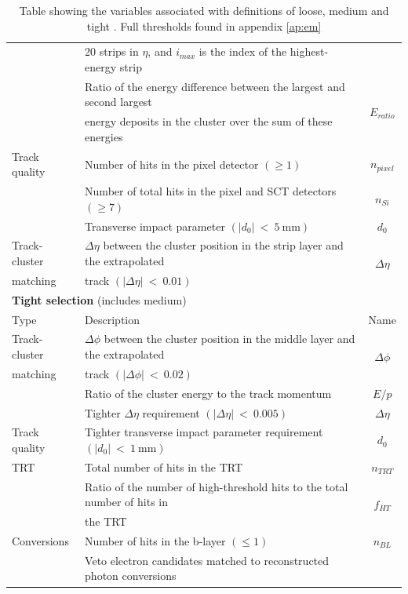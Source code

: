 \begin {table}[h!]
\begin{center}
\begin{tabular}{llc}
							& 20 strips in $\eta$, and $i_{max}$ is the index of the highest-energy strip 	& 						\\
							\rule{0pt}{3ex}
							& Ratio of the energy difference between the largest and second largest  		& \multirow{2}{*}{$E_{ratio}$}			\\
							& energy deposits in the cluster over the sum of these energies					&						\\
\rule{0pt}{4ex}Track quality	& Number of hits in the pixel detector $(\geq1)$							& $n_{pixel}$			\\
							& Number of total hits in the pixel and SCT detectors $(\geq7)$					& $n_{Si}$				\\
							& Transverse impact parameter $(|d_{0}|~<~5~\text{mm})$							& $d_{0}$				\\
\rule{0pt}{4ex}Track-cluster		& $\Delta\eta$ between the cluster position in the strip layer and the extrapolated 	& \multirow{2}{*}{$\Delta\eta$} 	\\
		matching			& track $(|\Delta\eta|~<~0.01)$													& 						\\
		\hline				
		\hline
		\multicolumn{3}{l}{{\bf Tight selection} (includes medium)}																	\\
		Type 				& Description 																	& Name 					\\
		\hline
\rule{0pt}{3ex}Track-cluster		& $\Delta\phi$ between the cluster position in the middle layer and the extrapolated 	& \multirow{2}{*}{$\Delta\phi$}	\\
		matching			& track $(|\Delta\phi|~<~0.02)$													& 						\\
							& Ratio of the cluster energy to the track momentum								& $E/p$					\\
							& Tighter $\Delta\eta$ requirement $(|\Delta\eta|~<~0.005)$						& $\Delta\eta$ 			\\
\rule{0pt}{4ex}Track quality		& Tighter transverse impact parameter requirement $(|d_{0}|~<~1~\text{mm})$		& $d_{0}$				\\
		TRT 				& Total number of hits in the TRT 												& $n_{TRT}$				\\
							& Ratio of the number of high-threshold hits to the total number of hits in 	& \multirow{2}{*}{$f_{HT}$}				\\
							& the TRT 																		& 						\\
\rule{0pt}{4ex}Conversions 	& Number of hits in the b-layer $(\leq1)$ 										& $n_{BL}$				\\
							& Veto electron candidates matched to reconstructed photon conversions 		 	& 						\\
		\hline
  		\end{tabular}
  	\caption{Table showing the variables associated with definitions of loose, medium and tight \cite{Aad:2011mk}. Full thresholds found in appendix \ref{ap:em}}
  	\label{tab:Rec_lmt}
  	\end{center}
	\end {table}












